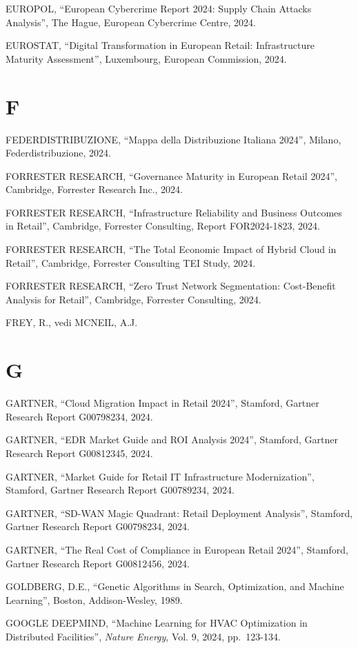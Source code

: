 \documentclass[12pt,a4paper,oneside]{book}
\numberwithin{figure}{chapter} %
\numberwithin{table}{chapter}  %
\begin{document}
EUROPOL, ``European Cybercrime Report 2024: Supply Chain Attacks
Analysis'', The Hague, European Cybercrime Centre, 2024.

EUROSTAT, ``Digital Transformation in European Retail: Infrastructure
Maturity Assessment'', Luxembourg, European Commission, 2024.

\section{F}\label{f-1}

FEDERDISTRIBUZIONE, ``Mappa della Distribuzione Italiana 2024'', Milano,
Federdistribuzione, 2024.

FORRESTER RESEARCH, ``Governance Maturity in European Retail 2024'',
Cambridge, Forrester Research Inc., 2024.

FORRESTER RESEARCH, ``Infrastructure Reliability and Business Outcomes
in Retail'', Cambridge, Forrester Consulting, Report FOR2024-1823, 2024.

FORRESTER RESEARCH, ``The Total Economic Impact of Hybrid Cloud in
Retail'', Cambridge, Forrester Consulting TEI Study, 2024.

FORRESTER RESEARCH, ``Zero Trust Network Segmentation: Cost-Benefit
Analysis for Retail'', Cambridge, Forrester Consulting, 2024.

FREY, R., vedi MCNEIL, A.J.

\section{G}\label{g-1}

GARTNER, ``Cloud Migration Impact in Retail 2024'', Stamford, Gartner
Research Report G00798234, 2024.

GARTNER, ``EDR Market Guide and ROI Analysis 2024'', Stamford, Gartner
Research Report G00812345, 2024.

GARTNER, ``Market Guide for Retail IT Infrastructure Modernization'',
Stamford, Gartner Research Report G00789234, 2024.

GARTNER, ``SD-WAN Magic Quadrant: Retail Deployment Analysis'',
Stamford, Gartner Research Report G00798234, 2024.

GARTNER, ``The Real Cost of Compliance in European Retail 2024'',
Stamford, Gartner Research Report G00812456, 2024.

GOLDBERG, D.E., ``Genetic Algorithms in Search, Optimization, and
Machine Learning'', Boston, Addison-Wesley, 1989.

GOOGLE DEEPMIND, ``Machine Learning for HVAC Optimization in Distributed
Facilities'', \emph{Nature Energy}, Vol. 9, 2024, pp.~123-134.
\end{document}
